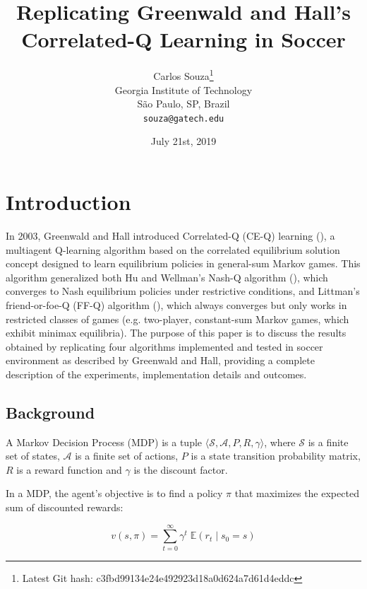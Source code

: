 \documentclass{article}
\title{Replicating Greenwald and Hall's Correlated-Q Learning in Soccer}
\date{July 21st, 2019}
\author{
Carlos Souza\thanks{Latest Git hash: c3fbd99134e24e492923d18a0d624a7d61d4eddc}\\
Georgia Institute of Technology\\
São Paulo, SP, Brazil \\
\texttt{souza@gatech.edu} \\
}
\begin{document}
    \maketitle



    \section{Introduction}
    \label{sec:introduction}
    In 2003, Greenwald  and Hall introduced Correlated-Q (CE-Q) learning (\cite{greenwald2003}), a multiagent Q-learning algorithm based on the correlated equilibrium solution concept designed to learn equilibrium policies in general-sum Markov games.
    This algorithm generalized both Hu and Wellman's Nash-Q algorithm (\cite{hu1998}), which converges to Nash equilibrium policies under restrictive conditions, and Littman's friend-or-foe-Q (FF-Q) algorithm (\cite{littman2001}), which always converges but only works in restricted classes of games (e.g. two-player, constant-sum Markov games, which exhibit minimax equilibria).
    The purpose of this paper is to discuss the results obtained by replicating four algorithms implemented and tested in soccer environment as described by Greenwald and Hall, providing a complete description of the experiments, implementation details and outcomes.

    \subsection{Background}
    \label{subsec:background}
    A Markov Decision Process (MDP) is a tuple $\langle \mathcal{S}, \mathcal{A}, P, R, \gamma \rangle$, where $\mathcal{S}$ is a finite set of states, $\mathcal{A}$ is a finite set of actions, $P$ is a state transition probability matrix, $R$ is a reward function and $\gamma$ is the discount factor.

    In a MDP, the agent's objective is to find a policy $\pi$ that maximizes the expected sum of discounted rewards:

    \begin{equation}
        v(s, \pi) = \sum_{t=0}^{\infty} \gamma^{t} \; \mathbb{E}(r_{t} \; | \; s_{0} = s)
    \end{equation}
\end{document}
